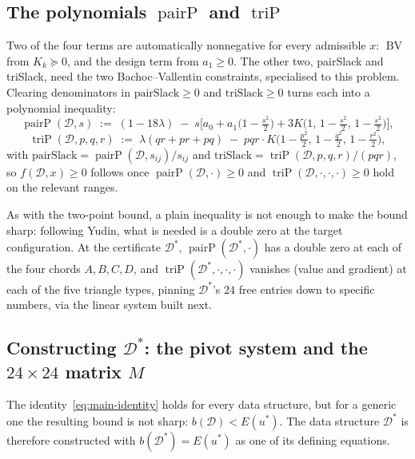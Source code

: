 \documentclass[11pt]{article}
\theoremstyle{definition}
\theoremstyle{remark}
\newcommand{\energy}{E}
\newcommand{\pairP}{\operatorname{pairP}}
\newcommand{\triP}{\operatorname{triP}}
\newcommand{\BV}{\operatorname{BV}}
\begin{document}
\subsection{The polynomials \texorpdfstring{$\pairP$}{pairP} and \texorpdfstring{$\triP$}{triP}}
\label{sec:method-nonneg}
\label{sec:method-pairP-triP}

Two of the four terms are automatically nonnegative for every admissible
$x$: $\BV$ from $K_k\succeq0$, and the design term from $a_1\ge0$. The
other two, pairSlack and triSlack, need the two Bachoc--Vallentin
constraints, specialised to this problem. Clearing denominators in
$\mathrm{pairSlack}\ge0$ and $\mathrm{triSlack}\ge0$ turns each into a
polynomial inequality:
\begin{equation}
  \pairP(\mathcal{D},s) \;:=\; (1-18\lambda) \;-\; s\Big[a_0 + a_1\big(1-\tfrac{s^2}2\big) + 3K\big(1,\,1-\tfrac{s^2}2,\,1-\tfrac{s^2}2\big)\Big],
\end{equation}
\begin{equation}
  \triP(\mathcal{D},p,q,r) \;:=\; \lambda(qr+pr+pq) \;-\; pqr\cdot K\big(1-\tfrac{p^2}2,\,1-\tfrac{q^2}2,\,1-\tfrac{r^2}2\big),
\end{equation}
with $\mathrm{pairSlack} = \pairP(\mathcal{D},s_{ij})/s_{ij}$ and
$\mathrm{triSlack} = \triP(\mathcal{D},p,q,r)/(pqr)$, so $f(\mathcal{D},x)\ge0$
follows once $\pairP(\mathcal{D},\cdot)\ge0$ and
$\triP(\mathcal{D},\cdot,\cdot,\cdot)\ge0$ hold on the relevant ranges.

As with the two-point bound, a plain inequality is not enough to make
the bound sharp: following Yudin, what is needed is a double zero at
the target configuration. At the
certificate $\mathcal{D}^*$, $\pairP(\mathcal{D}^*,\cdot)$ has a double zero at each of the
four chords $A,B,C,D$, and $\triP(\mathcal{D}^*,\cdot,\cdot,\cdot)$ vanishes
(value and gradient) at each of the five triangle types, pinning
$\mathcal{D}^*$'s $24$ free entries down to specific numbers, via the linear
system built next.

\subsection{Constructing \texorpdfstring{$\mathcal{D}^*$}{D*}: the pivot system and the \texorpdfstring{$24\times24$}{24x24} matrix \texorpdfstring{$M$}{M}}
\label{sec:method-pivots}

The identity~\eqref{eq:main-identity} holds for every data structure,
but for a generic one the resulting bound is not sharp:
$b(\mathcal{D})<\energy(u^*)$. The data structure $\mathcal{D}^*$ is
therefore constructed with $b(\mathcal{D}^*)=\energy(u^*)$ as one of its
defining equations.
\end{document}
